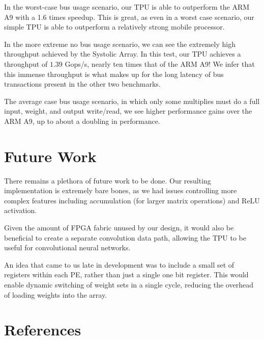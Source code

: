 \documentclass[11pt, conference, onecolumn]{IEEEtran}
\begin{document}
        In the worst-case bus usage scenario, our TPU is able to outperform the ARM A9
        with a 1.6 times speedup. This is great, as even in a worst case scenario, our
        simple TPU is able to outperform a relatively strong mobile processor.

        In the more extreme no bus usage scenario, we can see the extremely high throughput
        achieved by the Systolic Array. In this test, our TPU achieves a throughput of
        $1.39$ Gops/s, nearly ten times that of the ARM A9! We infer that this
        immense throughput is what makes up for the long latency of bus transactions
        present in the other two benchmarks.

        The average case bus usage scenario, in which only some multiplies must do a
        full input, weight, and output write/read, we see higher performance gains over
        the ARM A9, up to about a doubling in performance.

\section{Future Work}
    There remains a plethora of future work to be done. Our resulting implementation is
    extremely bare bones, as we had issues controlling more complex features including
    accumulation (for larger matrix operations) and ReLU activation.

    Given the amount of FPGA fabric unused by our design, it would also be beneficial to
    create a separate convolution data path, allowing the TPU to be useful for
    convolutional neural networks.

    An idea that came to us late in development was to include a small set of registers
    within each PE, rather than just a single one bit register. This would enable dynamic
    switching of weight sets in a single cycle, reducing the overhead of loading weights
    into the array.

\section*{References}
\end{document}
